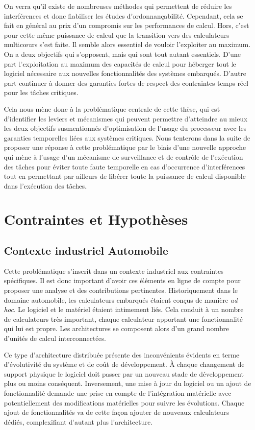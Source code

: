 \documentclass[french, a4paper, 11pt, twoside, pdftex]{StyleThese}
\begin{document}
		On verra qu'il existe de nombreuses méthodes qui permettent de réduire les interférences et donc fiabiliser les études d'ordonnançabilité. Cependant, cela se fait en général au prix d'un compromis sur les performances de calcul.
		Hors, c'est pour cette même puissance de calcul que la transition vers des calculateurs multicœurs s'est faite. Il semble alors essentiel de vouloir l'exploiter au maximum. On a deux objectifs qui s'opposent, mais qui sont tout autant essentiels. D'une part l'exploitation au maximum des capacités de calcul pour héberger tout le logiciel nécessaire aux nouvelles fonctionnalités des systèmes embarqués. D'autre part continuer à donner des garanties fortes de respect des contraintes temps réel pour les tâches critiques. 
		
		Cela nous mène donc à la problématique centrale de cette thèse, qui est d'identifier les leviers et mécanismes qui peuvent permettre d'atteindre au mieux les deux objectifs susmentionnés d'optimisation de l'usage du processeur avec les garanties temporelles liées aux systèmes critiques. 
		Nous tenterons dans la suite de proposer une réponse à cette problématique par le biais d'une nouvelle approche qui mène à l'usage d'un mécanisme de surveillance et de contrôle de l'exécution des tâches pour éviter toute faute temporelle en cas d'occurrence d'interférences tout en permettant par ailleurs de libérer toute la puissance de calcul disponible dans l'exécution des tâches.
	

\section{Contraintes et Hypothèses}
		
	\subsection{Contexte industriel Automobile}
		Cette problématique s'inscrit dans un contexte industriel aux contraintes spécifiques. Il est donc important d'avoir ces éléments en ligne de compte pour proposer une analyse et des contributions pertinentes. Historiquement dans le domaine automobile, les calculateurs embarqués étaient conçus de manière \emph{ad hoc}. Le logiciel et le matériel étaient intimement liés. Cela conduit à un nombre de calculateurs très important, chaque calculateur apportant une fonctionnalité qui lui est propre. Les architectures se composent alors d'un grand nombre d'unités de calcul interconnectées. 

		Ce type d'architecture distribuée présente des inconvénients évidents en terme d'évolutivité du système et de coût de développement. À chaque changement de support physique le logiciel doit passer par un nouveau stade de développement plus ou moins conséquent. Inversement, une mise à jour du logiciel ou un ajout de fonctionnalité demande une prise en compte de l'intégration matérielle avec potentiellement des modifications matérielles pour suivre les évolutions. Chaque ajout de fonctionnalités va de cette façon ajouter de nouveaux calculateurs dédiés, complexifiant d'autant plus l'architecture.
		
\end{document}
